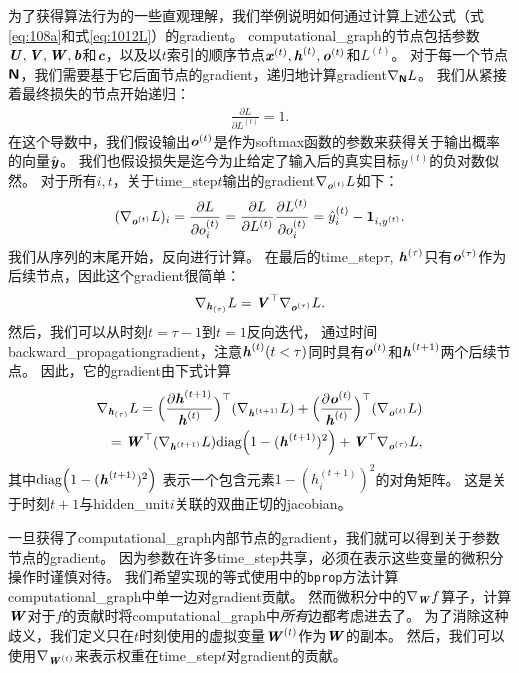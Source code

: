 为了获得算法行为的一些直观理解，我们举例说明如何通过计算上述公式（式\eqref{eq:108a}和式\eqref{eq:1012L}）的\gls{gradient}。
\gls{computational_graph}的节点包括参数$\boldsymbol{\mathit{U}},\boldsymbol{\mathit{V}},\boldsymbol{\mathit{W}}, \boldsymbol{\mathit{b}}$和$\boldsymbol{\mathit{c}}$，以及以$t$索引的顺序节点$\boldsymbol{\mathit{x}}^{(t)}, \boldsymbol{\mathit{h}}^{(t)},\boldsymbol{\mathit{o}}^{(t)}$和$L^{(t)}$。
对于每一个节点$\textsf{\textbf{N}}$，我们需要基于它后面节点的\gls{gradient}，递归地计算\gls{gradient}$\nabla_{\textsf{\textbf{N}}} L$。
我们从紧接着最终损失的节点开始递归：
\begin{align}
 \frac{\partial L}{\partial L^{(t)}} = 1.
\end{align}
在这个导数中，我们假设输出$\boldsymbol{\mathit{o}}^{(t)}$是作为\gls{softmax}函数的参数来获得关于输出概率的向量$\hat{\boldsymbol{\mathit{y}}}$。
我们也假设损失是迄今为止给定了输入后的真实目标$y^{(t)}$的负对数似然。
对于所有$i,t$，关于\gls{time_step}$t$输出的\gls{gradient}$\nabla_{\boldsymbol{\mathit{o}}^{(t)}} L$如下：
\begin{align}
 (\nabla_{\boldsymbol{\mathit{o}}^{(t)}} L)_i =  \frac{\partial L}{\partial o_i^{(t)}} 
 =  \frac{\partial L}{\partial L^{(t)}}  \frac{\partial L^{(t)}}{\partial o_i^{(t)}}  
 = \hat y_i^{(t)} - \mathbf{1}_{i,y^{(t)}}.
\end{align}
我们从序列的末尾开始，反向进行计算。
在最后的\gls{time_step}$\tau$, $\boldsymbol{\mathit{h}}^{(\tau)}$只有$\boldsymbol{\mathit{o}}^{(\tau)}$作为后续节点，因此这个\gls{gradient}很简单：
\begin{align}
 \nabla_{\boldsymbol{\mathit{h}}_{(\tau)}} L = \boldsymbol{\mathit{V}}^\top \nabla_{\boldsymbol{\mathit{o}}^{(\tau)}} L.
\end{align}
然后，我们可以从时刻$t=\tau-1$到$t=1$反向迭代， 通过时间\gls{backward_propagation}\gls{gradient}，注意$\boldsymbol{\mathit{h}}^{(t)}(t < \tau)$同时具有$\boldsymbol{\mathit{o}}^{(t)}$和$\boldsymbol{\mathit{h}}^{(t+1)}$两个后续节点。
因此，它的\gls{gradient}由下式计算
\begin{align}
  \nabla_{\boldsymbol{\mathit{h}}_{(\tau)}} L = \Big( \frac{\partial \boldsymbol{\mathit{h}}^{(t+1)}}{ \boldsymbol{\mathit{h}}^{(t)}}  \Big)^\top(\nabla_{\boldsymbol{\mathit{h}}^{(t+1)}} L) 
  + \Big( \frac{\partial \boldsymbol{\mathit{o}}^{(t)}}{ \boldsymbol{\mathit{h}}^{(t)}}  \Big)^\top (\nabla_{\boldsymbol{\mathit{o}}^{(t)}} L) \\
  = \boldsymbol{\mathit{W}}^\top (\nabla_{\boldsymbol{\mathit{h}}^{(t+1)}} L) \text{diag} \Big( 1 - (\boldsymbol{\mathit{h}}^{(t+1)})^2 \Big) 
  + \boldsymbol{\mathit{V}}^\top \nabla_{\boldsymbol{\mathit{o}}^{(\tau)}} L,
\end{align}
其中$\text{diag} \Big( 1 - (\boldsymbol{\mathit{h}}^{(t+1)})^2 \Big) $ 表示一个包含元素$1 - (h_i^{(t+1)})^2$的对角矩阵。
这是关于时刻$t+1$与\gls{hidden_unit}$i$关联的双曲正切的\gls{jacobian}。


一旦获得了\gls{computational_graph}内部节点的\gls{gradient}，我们就可以得到关于参数节点的\gls{gradient}。
因为参数在许多\gls{time_step}共享，必须在表示这些变量的微积分操作时谨慎对待。
我们希望实现的等式使用中的{\tt bprop}方法计算\gls{computational_graph}中单一边对\gls{gradient}贡献。
然而微积分中的$\nabla_{\boldsymbol{\mathit{W}}} f$算子，计算$\boldsymbol{\mathit{W}}$对于$f$的贡献时将\gls{computational_graph}中\emph{所有}边都考虑进去了。
为了消除这种歧义，我们定义只在$t$时刻使用的虚拟变量$\boldsymbol{\mathit{W}}^{(t)}$作为$\boldsymbol{\mathit{W}}$的副本。
然后，我们可以使用$\nabla_{\boldsymbol{\mathit{W}}^{(t)}}$来表示权重在\gls{time_step}$t$对\gls{gradient}的贡献。

